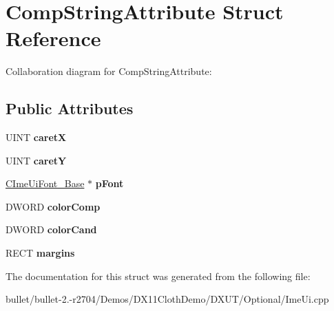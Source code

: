 \hypertarget{struct_comp_string_attribute}{\section{Comp\+String\+Attribute Struct Reference}
\label{struct_comp_string_attribute}
}


Collaboration diagram for Comp\+String\+Attribute\+:
\subsection*{Public Attributes}
\begin{DoxyCompactItemize}
\item 
\hypertarget{struct_comp_string_attribute_a6c39db7b50bce9aa4cb5ebe553d66e04}{U\+I\+N\+T {\bfseries caret\+X}}\label{struct_comp_string_attribute_a6c39db7b50bce9aa4cb5ebe553d66e04}

\item 
\hypertarget{struct_comp_string_attribute_a2b9fc77f7fcc40c93737b9a2cb3f061b}{U\+I\+N\+T {\bfseries caret\+Y}}\label{struct_comp_string_attribute_a2b9fc77f7fcc40c93737b9a2cb3f061b}

\item 
\hypertarget{struct_comp_string_attribute_ad42afe3ad2a0e692e1c8cf5481d82e3c}{\hyperlink{class_c_ime_ui_font___base}{C\+Ime\+Ui\+Font\+\_\+\+Base} $\ast$ {\bfseries p\+Font}}\label{struct_comp_string_attribute_ad42afe3ad2a0e692e1c8cf5481d82e3c}

\item 
\hypertarget{struct_comp_string_attribute_a865539b81328ee18ac5538b3c61dbdbb}{D\+W\+O\+R\+D {\bfseries color\+Comp}}\label{struct_comp_string_attribute_a865539b81328ee18ac5538b3c61dbdbb}

\item 
\hypertarget{struct_comp_string_attribute_a9cd40bf298ae4327004083603f1b4b9e}{D\+W\+O\+R\+D {\bfseries color\+Cand}}\label{struct_comp_string_attribute_a9cd40bf298ae4327004083603f1b4b9e}

\item 
\hypertarget{struct_comp_string_attribute_a09de2831c91075c3b25d8ff5e94d0eed}{R\+E\+C\+T {\bfseries margins}}\label{struct_comp_string_attribute_a09de2831c91075c3b25d8ff5e94d0eed}

\end{DoxyCompactItemize}


The documentation for this struct was generated from the following file\+:\begin{DoxyCompactItemize}
\item 
bullet/bullet-\/2.-\/r2704/\+Demos/\+D\+X11\+Cloth\+Demo/\+D\+X\+U\+T/\+Optional/Ime\+Ui.\+cpp\end{DoxyCompactItemize}
